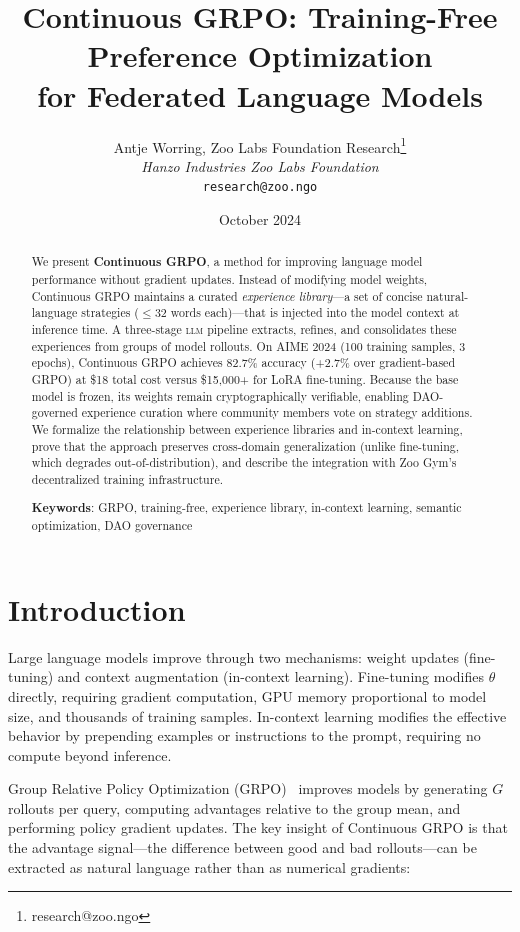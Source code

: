 \documentclass[11pt,letterpaper]{article}
\title{\textbf{Continuous GRPO: Training-Free Preference Optimization\\for Federated Language Models}}
\author{
Antje Worring, Zoo Labs Foundation Research\thanks{research@zoo.ngo}\\
\textit{Hanzo Industries \quad Zoo Labs Foundation}\\
\texttt{research@zoo.ngo}
}
\date{October 2024}
\newcommand{\LLM}{\textsc{llm}}
\begin{document}
\zoocoverpage

\begin{abstract}
We present \textbf{Continuous GRPO}, a method for improving language model performance without gradient updates.  Instead of modifying model weights, Continuous GRPO maintains a curated \textit{experience library}---a set of concise natural-language strategies ($\leq$32 words each)---that is injected into the model context at inference time.  A three-stage \LLM{} pipeline extracts, refines, and consolidates these experiences from groups of model rollouts.  On AIME 2024 (100 training samples, 3 epochs), Continuous GRPO achieves 82.7\% accuracy (+2.7\% over gradient-based GRPO) at \$18 total cost versus \$15{,}000+ for LoRA fine-tuning.  Because the base model is frozen, its weights remain cryptographically verifiable, enabling DAO-governed experience curation where community members vote on strategy additions.  We formalize the relationship between experience libraries and in-context learning, prove that the approach preserves cross-domain generalization (unlike fine-tuning, which degrades out-of-distribution), and describe the integration with Zoo Gym's decentralized training infrastructure.

\textbf{Keywords}: GRPO, training-free, experience library, in-context learning, semantic optimization, DAO governance
\end{abstract}

\section{Introduction}
\label{sec:intro}

Large language models improve through two mechanisms: weight updates (fine-tuning) and context augmentation (in-context learning).  Fine-tuning modifies $\theta$ directly, requiring gradient computation, GPU memory proportional to model size, and thousands of training samples.  In-context learning modifies the effective behavior by prepending examples or instructions to the prompt, requiring no compute beyond inference.

Group Relative Policy Optimization (GRPO)~\cite{shao2024deepseekmath} improves models by generating $G$ rollouts per query, computing advantages relative to the group mean, and performing policy gradient updates.  The key insight of Continuous GRPO is that the advantage signal---the difference between good and bad rollouts---can be extracted as natural language rather than as numerical gradients:
\end{document}
